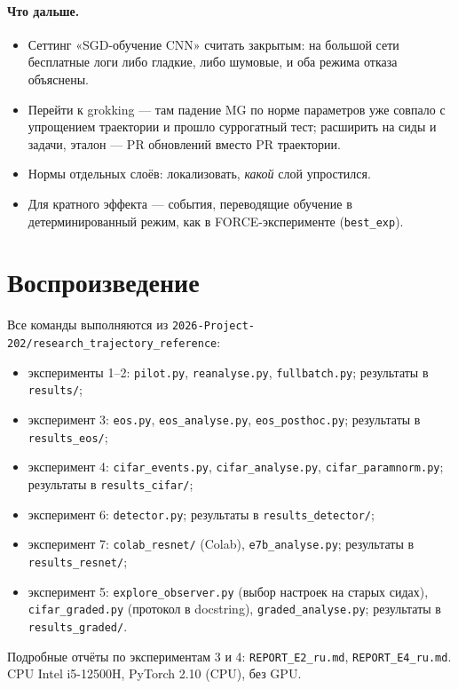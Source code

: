 \documentclass[10pt,a4paper]{article}
\begin{document}
\paragraph{Что дальше.}
\begin{itemize}\setlength\itemsep{1pt}
\item Сеттинг «SGD-обучение CNN» считать закрытым: на большой сети бесплатные логи
  либо гладкие, либо шумовые, и оба режима отказа объяснены.
\item Перейти к grokking --- там падение MG по норме параметров уже совпало с
  упрощением траектории и прошло суррогатный тест; расширить на сиды и задачи, эталон
  --- PR обновлений вместо PR траектории.
\item Нормы отдельных слоёв: локализовать, \emph{какой} слой упростился.
\item Для кратного эффекта --- события, переводящие обучение в детерминированный
  режим, как в FORCE-эксперименте (\texttt{best\_exp}).
\end{itemize}

\section*{Воспроизведение}
\small
Все команды выполняются из \texttt{2026-Project-202/research\_trajectory\_reference}:
\begin{itemize}\setlength\itemsep{0pt}
\item эксперименты 1--2: \texttt{pilot.py}, \texttt{reanalyse.py},
  \texttt{fullbatch.py}; результаты в \texttt{results/};
\item эксперимент 3: \texttt{eos.py}, \texttt{eos\_analyse.py},
  \texttt{eos\_posthoc.py}; результаты в \texttt{results\_eos/};
\item эксперимент 4: \texttt{cifar\_events.py}, \texttt{cifar\_analyse.py},
  \texttt{cifar\_paramnorm.py}; результаты в \texttt{results\_cifar/};
\item эксперимент 6: \texttt{detector.py}; результаты в \texttt{results\_detector/};
\item эксперимент 7: \texttt{colab\_resnet/} (Colab), \texttt{e7b\_analyse.py};
  результаты в \texttt{results\_resnet/};
\item эксперимент 5: \texttt{explore\_observer.py} (выбор настроек на старых
  сидах), \newline\texttt{cifar\_graded.py} (протокол в docstring),
  \texttt{graded\_analyse.py}; результаты в \texttt{results\_graded/}.
\end{itemize}
Подробные отчёты по экспериментам 3 и 4: \texttt{REPORT\_E2\_ru.md},
\texttt{REPORT\_E4\_ru.md}. CPU Intel i5-12500H, PyTorch 2.10 (CPU), без GPU.
\end{document}
